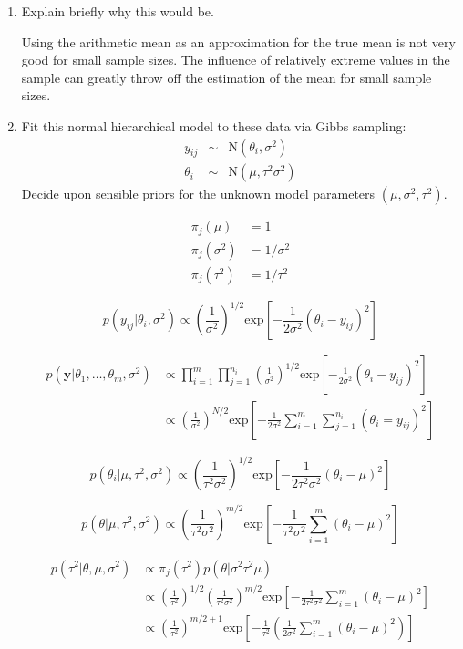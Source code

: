 \documentclass[10pt]{article}
\begin{document}
    \begin{enumerate}
        \item Explain briefly why this would be.

        Using the arithmetic mean as an approximation for the true mean is not very good for small sample sizes. The influence of relatively extreme values in the sample can greatly throw off the estimation of the mean for small sample sizes.

        \item Fit this normal hierarchical model to these data via Gibbs sampling:
        \begin{eqnarray*}
        y_{ij} &\sim& \mbox{N}(\theta_i, \sigma^2) \\
        \theta_i &\sim& \mbox{N}(\mu, \tau^2 \sigma^2)
        \end{eqnarray*}
        Decide upon sensible priors for the unknown model parameters $(\mu, \sigma^2, \tau^2)$.

        \begin{align*}
            \pi_j(\mu) &= 1 \\
            \pi_j(\sigma^2) &= 1/\sigma^2 \\
            \pi_j(\tau^2) &= 1/\tau^2
        \end{align*}

        $$p(y_{ij} | \theta_i, \sigma^2) \propto \left(\frac{1}{\sigma^2}\right)^{1/2} \text{exp}\left[-\frac{1}{2 \sigma^2} (\theta_i - y_{ij})^2 \right]$$

        \begin{align*}
            p(\mathbf{y} | \theta_1, \dots, \theta_m, \sigma^2) & \propto \prod_{i=1}^m \prod_{j=1}^{n_i} \left(\frac{1}{\sigma^2}\right)^{1/2} \text{exp}\left[-\frac{1}{2 \sigma^2} (\theta_i - y_{ij})^2 \right] \\
            & \propto \left(\frac{1}{\sigma^2}\right)^{N/2} \text{exp}\left[-\frac{1}{2\sigma^2} \sum_{i=1}^m \sum_{j=1}^{n_i} (\theta_i = y_{ij})^2 \right]
        \end{align*}

        $$p(\theta_i | \mu, \tau^2, \sigma^2) \propto \left(\frac{1}{\tau^2 \sigma^2} \right)^{1/2} \text{exp}\left[-\frac{1}{2 \tau^2 \sigma^2} (\theta_i - \mu)^2 \right]$$

        $$p(\theta | \mu, \tau^2, \sigma^2) \propto \left(\frac{1}{\tau^2 \sigma^2} \right)^{m/2} \text{exp}\left[-\frac{1}{\tau^2 \sigma^2} \sum_{i=1}^m (\theta_i - \mu)^2 \right]$$

        \begin{align*}
            p(\tau^2 | \theta, \mu, \sigma^2) &\propto \pi_j(\tau^2) p(\theta | \sigma^2 \tau^2 \mu) \\
            &\propto \left(\frac{1}{\tau^2}\right)^{1/2} \left(\frac{1}{\tau^2 \sigma^2} \right)^{m/2} \text{exp}\left[-\frac{1}{2\tau^2 \sigma^2} \sum_{i=1}^m (\theta_i - \mu)^2 \right] \\
            &\propto \left(\frac{1}{\tau^2}\right)^{m/2+1} \text{exp}\left[-\frac{1}{\tau^2} \left(\frac{1}{2\sigma^2 } \sum_{i=1}^m (\theta_i - \mu)^2 \right) \right]
        \end{align*}


\end{enumerate}
\end{document}
